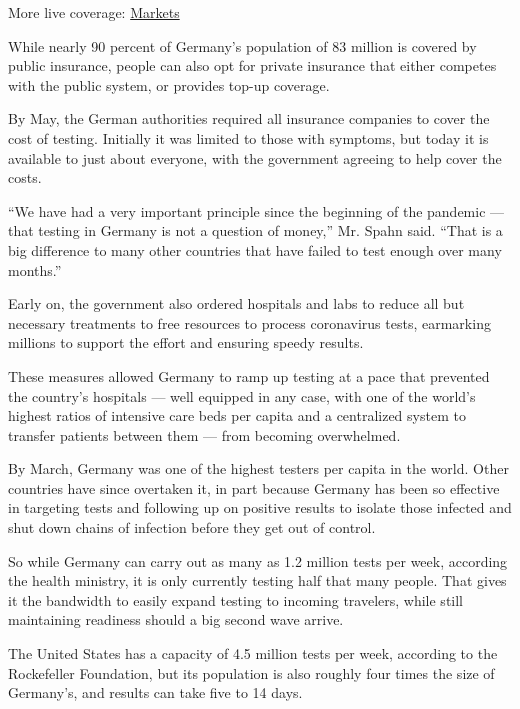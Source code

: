 More live coverage:
\href{https://www.nytimes.com/live/2020/08/07/business/stock-market-today-coronavirus?action=click\&pgtype=Article\&state=default\&region=MAIN_CONTENT_1\&context=storylines_live_updates}{Markets}

While nearly 90 percent of Germany's population of 83 million is covered
by public insurance, people can also opt for private insurance that
either competes with the public system, or provides top-up coverage.

By May, the German authorities required all insurance companies to cover
the cost of testing. Initially it was limited to those with symptoms,
but today it is available to just about everyone, with the government
agreeing to help cover the costs.

``We have had a very important principle since the beginning of the
pandemic --- that testing in Germany is not a question of money,'' Mr.
Spahn said. ``That is a big difference to many other countries that have
failed to test enough over many months.''

Early on, the government also ordered hospitals and labs to reduce all
but necessary treatments to free resources to process coronavirus tests,
earmarking millions to support the effort and ensuring speedy results.

These measures allowed Germany to ramp up testing at a pace that
prevented the country's hospitals --- well equipped in any case, with
one of the world's highest ratios of intensive care beds per capita and
a centralized system to transfer patients between them --- from becoming
overwhelmed.

By March, Germany was one of the highest testers per capita in the
world. Other countries have since overtaken it, in part because Germany
has been so effective in targeting tests and following up on positive
results to isolate those infected and shut down chains of infection
before they get out of control.

So while Germany can carry out as many as 1.2 million tests per week,
according the health ministry, it is only currently testing half that
many people. That gives it the bandwidth to easily expand testing to
incoming travelers, while still maintaining readiness should a big
second wave arrive.

The United States has a capacity of 4.5 million tests per week,
according to the Rockefeller Foundation, but its population is also
roughly four times the size of Germany's, and results can take five to
14 days.

